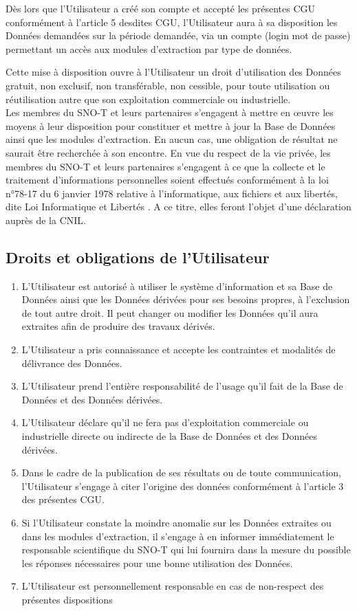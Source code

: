 \documentclass[]{article}
\begin{document}
Dès lors que l’Utilisateur a créé son compte et accepté les présentes CGU conformément à l’article 5 desdites CGU, l’Utilisateur aura à sa disposition les Données demandées sur la période demandée, via un compte (login mot de passe) permettant un accès aux modules d’extraction par type de données.

Cette mise à disposition ouvre à l’Utilisateur un droit d’utilisation des Données gratuit, non exclusif, non transférable, non cessible, pour toute utilisation ou réutilisation autre que son exploitation commerciale ou industrielle.\\

Les membres du SNO-T et leurs partenaires s’engagent à mettre en \oe{}uvre les moyens à leur disposition pour constituer et mettre à jour la Base de Données ainsi que les modules d’extraction. En aucun cas, une obligation de résultat ne saurait être recherchée à son encontre.
En vue du respect de la vie privée, les membres du SNO-T et leurs partenaires s’engagent à ce que la collecte et le traitement d’informations personnelles soient effectués conformément à la loi n°78-17 du 6 janvier 1978 relative à l’informatique, aux fichiers et aux libertés, dite Loi \og{}Informatique et Libertés \fg{}. A ce titre, elles feront l’objet d’une déclaration auprès de la CNIL.

\subsection{Droits et obligations de l'Utilisateur}

\begin{enumerate}
\item L’Utilisateur est autorisé à utiliser le système d’information et sa Base de Données ainsi que les Données dérivées pour ses besoins propres, à l’exclusion de tout autre droit. Il peut changer ou modifier les Données qu’il aura extraites afin de produire des travaux dérivés.
\item L’Utilisateur a pris connaissance et accepte les contraintes et modalités de délivrance des Données.
\item L’Utilisateur prend l’entière responsabilité de l’usage qu’il fait de la Base de Données et des
Données dérivées.
\item L’Utilisateur déclare qu’il ne fera pas d’exploitation commerciale ou industrielle directe ou indirecte de la Base de Données et des Données dérivées.
\item Dans le cadre de la publication de ses résultats ou de toute communication, l’Utilisateur s’engage à citer l’origine des données conformément à l’article 3 des présentes CGU.
\item Si l’Utilisateur constate la moindre anomalie sur les Données extraites ou dans les modules d’extraction, il s’engage à en informer immédiatement le responsable scientifique du SNO-T qui lui fournira dans la mesure du possible les réponses nécessaires pour une bonne utilisation des Données.
\item L’Utilisateur est personnellement responsable en cas de non-respect des présentes dispositions
\end{enumerate}	
\end{document}
